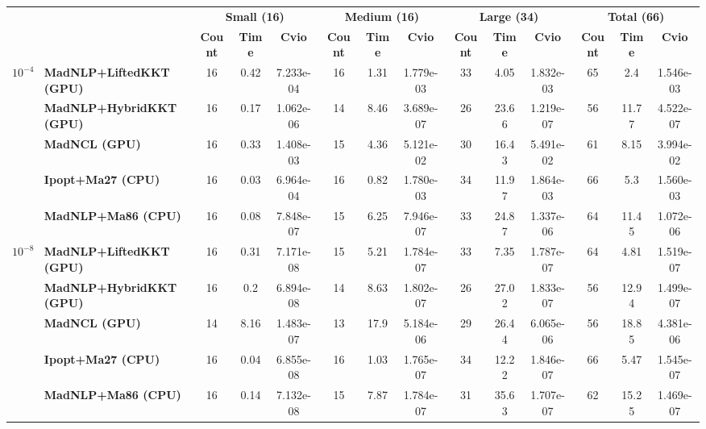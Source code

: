 \begin{center}
\renewcommand{\arraystretch}{0.9}
\begin{tabular}{|l|l|ccc|ccc|ccc|ccc|}
\hline
 & & \multicolumn{3}{c|}{\textbf{Small (16)}} & \multicolumn{3}{c|}{\textbf{Medium (16)}} & \multicolumn{3}{c|}{\textbf{Large (34)}} & \multicolumn{3}{c|}{\textbf{Total (66)}} \\
 & & \textbf{Count} & \textbf{Time} & \textbf{Cvio} & \textbf{Count} & \textbf{Time} & \textbf{Cvio} & \textbf{Count} & \textbf{Time} & \textbf{Cvio} & \textbf{Count} & \textbf{Time} & \textbf{Cvio}\\
\hline
\multirow{5}{*}{\Large\textbf{$10^{-4}$}} & \textbf{MadNLP+LiftedKKT (GPU)} & \cellcolor{blue!15}16 & 0.42 & 7.233e-04 & \cellcolor{blue!15}16 & 1.31 & 1.779e-03 & 33 & \cellcolor{blue!15}4.05 & 1.832e-03 & 65 & \cellcolor{blue!15}2.4 & 1.546e-03 \\
 & \textbf{MadNLP+HybridKKT (GPU)} & \cellcolor{blue!15}16 & 0.17 & 1.062e-06 & 14 & 8.46 & \cellcolor{blue!15}3.689e-07 & 26 & 23.66 & \cellcolor{blue!15}1.219e-07 & 56 & 11.77 & \cellcolor{blue!15}4.522e-07 \\
 & \textbf{MadNCL (GPU)} & \cellcolor{blue!15}16 & 0.33 & 1.408e-03 & 15 & 4.36 & 5.121e-02 & 30 & 16.43 & 5.491e-02 & 61 & 8.15 & 3.994e-02 \\
 & \textbf{Ipopt+Ma27 (CPU)} & \cellcolor{blue!15}16 & \cellcolor{blue!15}0.03 & 6.964e-04 & \cellcolor{blue!15}16 & \cellcolor{blue!15}0.82 & 1.780e-03 & \cellcolor{blue!15}34 & 11.97 & 1.864e-03 & \cellcolor{blue!15}66 & 5.3 & 1.560e-03 \\
 & \textbf{MadNLP+Ma86 (CPU)} & \cellcolor{blue!15}16 & 0.08 & \cellcolor{blue!15}7.848e-07 & 15 & 6.25 & 7.946e-07 & 33 & 24.87 & 1.337e-06 & 64 & 11.45 & 1.072e-06 \\
\hline
\multirow{5}{*}{\Large\textbf{$10^{-8}$}} & \textbf{MadNLP+LiftedKKT (GPU)} & \cellcolor{blue!15}16 & 0.31 & 7.171e-08 & 15 & 5.21 & 1.784e-07 & 33 & \cellcolor{blue!15}7.35 & 1.787e-07 & 64 & \cellcolor{blue!15}4.81 & 1.519e-07 \\
 & \textbf{MadNLP+HybridKKT (GPU)} & \cellcolor{blue!15}16 & 0.2 & 6.894e-08 & 14 & 8.63 & 1.802e-07 & 26 & 27.02 & 1.833e-07 & 56 & 12.94 & 1.499e-07 \\
 & \textbf{MadNCL (GPU)} & 14 & 8.16 & 1.483e-07 & 13 & 17.9 & 5.184e-06 & 29 & 26.44 & 6.065e-06 & 56 & 18.85 & 4.381e-06 \\
 & \textbf{Ipopt+Ma27 (CPU)} & \cellcolor{blue!15}16 & \cellcolor{blue!15}0.04 & \cellcolor{blue!15}6.855e-08 & \cellcolor{blue!15}16 & \cellcolor{blue!15}1.03 & \cellcolor{blue!15}1.765e-07 & \cellcolor{blue!15}34 & 12.22 & 1.846e-07 & \cellcolor{blue!15}66 & 5.47 & 1.545e-07 \\
 & \textbf{MadNLP+Ma86 (CPU)} & \cellcolor{blue!15}16 & 0.14 & 7.132e-08 & 15 & 7.87 & 1.784e-07 & 31 & 35.63 & \cellcolor{blue!15}1.707e-07 & 62 & 15.25 & \cellcolor{blue!15}1.469e-07 \\
\hline
\end{tabular}
\end{center}
